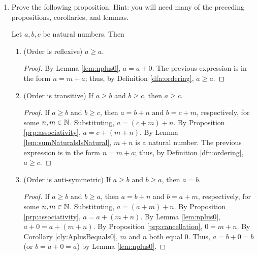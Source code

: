 \documentclass[../main.tex]{subfiles}
\begin{document}
\begin{enumerate}[ref={\thesection.\arabic*}]
    \begin{lem}\label{lem:backwardsIncrement}
        Let $a$ be a positive number. Then there exists exactly one natural number $b$ such that $b\pplus=a$.
        \begin{proof}
            We induct on $a$. Consider the base case $a=1$. $1=0\pplus$ by definition, and by Axiom \ref{axm:successorDistinctness}, 0 is the only $b$ satisfying $1=b\pplus$. Now suppose inductively that $a$ has only one $b$ satisfying $b\pplus=a$. Then $a\pplus$ has only one natural number (namely $a$) satisfying $a\pplus=a\pplus$. This closes the induction.
        \end{proof}
    \end{lem}
    \item \label{exr:2.2.3}Prove the following proposition. Hint: you will need many of the preceding propositions, corollaries, and lemmas.
    \begin{prp}\label{prp:ordering}
        Let $a,b,c$ be natural numbers. Then
        \begin{enumerate}[label={\textup{(}\alph*\textup{)}}]
            \item \textup{(}Order is reflexive\textup{)} $a\geq a$.
            \begin{proof}
                By Lemma \ref{lem:nplus0}, $a=a+0$. The previous expression is in the form $n=m+a$; thus, by Definition \ref{dfn:ordering}, $a\geq a$.
            \end{proof}
            \item \textup{(}Order is transitive\textup{)} If $a\geq b$ and $b\geq c$, then $a\geq c$.
            \begin{proof}
                If $a\geq b$ and $b\geq c$, then $a=b+n$ and $b=c+m$, respectively, for some $n,m\in\mathbb{N}$. Substituting, $a=(c+m)+n$. By Proposition \ref{prp:associativity}, $a=c+(m+n)$. By Lemma \ref{lem:sumNaturalsIsNatural}, $m+n$ is a natural number. The previous expression is in the form $n=m+a$; thus, by Definition \ref{dfn:ordering}, $a\geq c$.
            \end{proof}
            \item \textup{(}Order is anti-symmetric\textup{)} If $a\geq b$ and $b\geq a$, then $a=b$.
            \begin{proof}
                If $a\geq b$ and $b\geq a$, then $a=b+n$ and $b=a+m$, respectively, for some $n,m\in\mathbb{N}$. Substituting, $a=(a+m)+n$. By Proposition \ref{prp:associativity}, $a=a+(m+n)$. By Lemma \ref{lem:nplus0}, $a+0=a+(m+n)$. By Proposition \ref{prp:cancellation}, $0=m+n$. By Corollary \ref{cly:AplusBequals0}, $m$ and $n$ both equal 0. Thus, $a=b+0=b$ (or $b=a+0=a$) by Lemma \ref{lem:nplus0}.

\end{proof}
\end{enumerate}
\end{prp}
\end{enumerate}
\end{document}
